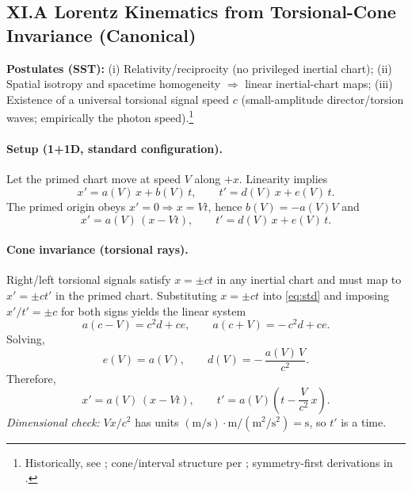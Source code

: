 \documentclass[10pt,reprint,aps,onecolumn,nofootinbib]{revtex4-2}
\begin{document}
    \subsection*{XI.A \; Lorentz Kinematics from Torsional-Cone Invariance (Canonical)}
        \textbf{Postulates (SST):} (i) Relativity/reciprocity (no privileged inertial chart); (ii) Spatial isotropy and spacetime homogeneity $\Rightarrow$ linear inertial-chart maps; (iii) Existence of a universal torsional signal speed $c$ (small-amplitude director/torsion waves; empirically the photon speed).\footnote{Historically, see \cite{Einstein1905}; cone/interval structure per \cite{Minkowski1909}; symmetry-first derivations in \cite{LevyLeblond1976}.}

        \paragraph{Setup (1+1D, standard configuration).}
            Let the primed chart move at speed $V$ along $+x$. Linearity implies
            \begin{equation}
                x' = a(V)\,x + b(V)\,t,\qquad t' = d(V)\,x + e(V)\,t. \label{eq:lin}
            \end{equation}
            The primed origin obeys $x'=0 \Rightarrow x=Vt$, hence $b(V)=-a(V)V$ and
            \begin{equation}
                x' = a(V)\,(x - Vt), \qquad t' = d(V)\,x + e(V)\,t. \label{eq:std}
            \end{equation}

        \paragraph{Cone invariance (torsional rays).}
            Right/left torsional signals satisfy $x=\pm ct$ in any inertial chart and must map to $x'=\pm c t'$ in the primed chart. Substituting $x=\pm ct$ into \eqref{eq:std} and imposing $x'/t'=\pm c$ for both signs yields the linear system
            \begin{equation}
                a(c - V) = c^{2} d + c e,\qquad a(c + V) = -\,c^{2} d + c e.
            \end{equation}
            Solving,
            \begin{equation}
                e(V)=a(V), \qquad d(V)=-\,\frac{a(V)\,V}{c^{2}}. \label{eq:de}
            \end{equation}
            Therefore,
            \begin{equation}
                \boxed{~x' = a(V)\,(x - Vt), \qquad t' = a(V)\!\left(t - \frac{V}{c^{2}}\,x\right).~} \label{eq:preLorentz}
            \end{equation}
            \emph{Dimensional check:} $Vx/c^2$ has units $(\mathrm{m/s})\cdot \mathrm{m}/(\mathrm{m^2/s^2})=\mathrm{s}$, so $t'$ is a time.
\end{document}
